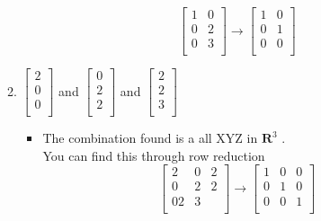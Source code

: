 \documentclass[12pt,letterpaper]{article}
\begin{document}
\begin{enumerate}
\begin{enumerate}
\begin{itemize}
$$\begin{bmatrix} 
1 & 0 \\
0 & 2 \\
0  & 3\\
\end{bmatrix} \rightarrow \begin{bmatrix} 
1 & 0\\
0 & 1\\
0 & 0\\
\end{bmatrix}$$
    \end{itemize}
        \item $\begin{bmatrix}
2 \\
0 \\
0 \\
\end{bmatrix}$ and $\begin{bmatrix}
0 \\
2 \\
2 \\
\end{bmatrix}$ and $\begin{bmatrix}
2 \\
2 \\
3 \\
\end{bmatrix}$
 \begin{itemize}
        \item The combination found is a all XYZ in $\textbf{R}^3$ . \\You can find this through row reduction
$$\begin{bmatrix} 
2 & 0 & 2\\
0 & 2 & 2\\
0 2 & 3\\
\end{bmatrix} \rightarrow \begin{bmatrix} 
1 & 0 & 0\\
0 & 1 & 0\\
0 & 0 & 1\\
\end{bmatrix}$$
    \end{itemize}
    \end{enumerate}
\end{enumerate}
\end{document}
